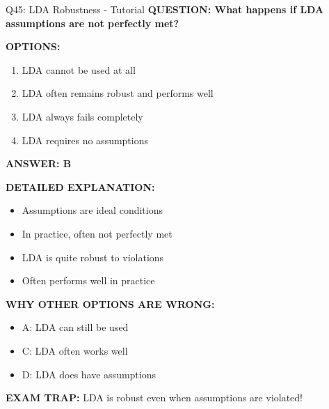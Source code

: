 \documentclass[8pt]{beamer}
\begin{document}
	\begin{frame}{Q45: LDA Robustness - Tutorial}
		\fontsize{6.5}{7.5}\selectfont
		\textbf{QUESTION: What happens if LDA assumptions are not perfectly met?}
		
		\vspace{0.1cm}
		\textbf{OPTIONS:}
		\begin{enumerate}
			\item LDA cannot be used at all
			\item LDA often remains robust and performs well
			\item LDA always fails completely
			\item LDA requires no assumptions
		\end{enumerate}
		
		\vspace{0.1cm}
		\textcolor{myblue}{\textbf{ANSWER: B}}
		
		\vspace{0.1cm}
		\textbf{DETAILED EXPLANATION:}
		\begin{itemize}
			\item Assumptions are ideal conditions
			\item In practice, often not perfectly met
			\item LDA is quite robust to violations
			\item Often performs well in practice
		\end{itemize}
		
		\vspace{0.1cm}
		\textcolor{myred}{\textbf{WHY OTHER OPTIONS ARE WRONG:}}
		\begin{itemize}
			\item \textcolor{myred}{A:} LDA can still be used
			\item \textcolor{myred}{C:} LDA often works well
			\item \textcolor{myred}{D:} LDA does have assumptions
		\end{itemize}
		
		\textcolor{myred}{\textbf{EXAM TRAP:}} LDA is \textcolor{myblue}{robust} even when assumptions are violated!
	\end{frame}
	
	
\end{document}
